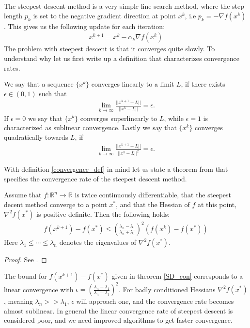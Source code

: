 \\
\\
The steepest descent method is a very simple line search method, where the step length $p_k$ is set to the negative gradient direction at point $x^k$, i.e $p_k = -\nabla f(x^k)$. This gives us the following update for each iteration:
\begin{align}
x^{k+1} = x^k - \alpha_k \nabla f(x^k) \label{SD_itr}
\end{align} 
The problem with steepest descent is that it converges quite slowly. To understand why let us first write up a definition that characterizes convergence rates.
\begin{definition} \label{convergence_def}
We say that a sequence $\{x^k\}$ converges linearly to a limit $L$, if there exists $\epsilon\in(0,1)$ such that
\begin{align*}
\lim_{k\rightarrow\infty}\frac{||x^{k+1}-L||}{||x^k-L||} =\epsilon.
\end{align*} 
If $\epsilon=0$ we say that $\{x^k\}$ converges superlinearly to $L$, while $\epsilon=1$ is characterized as sublinear convergence. Lastly we say that $\{x^k\}$ converges quadratically towards $L$, if
\begin{align*}
\lim_{k\rightarrow\infty}\frac{||x^{k+1}-L||}{||x^k-L||^2} =\epsilon.
\end{align*}
\end{definition}
\noindent
With definition \ref{convergence_def} in mind let us state a theorem from \cite{nocedal2006numerical} that specifies the convergence rate of the steepest descent method.
\begin{theorem}
\label{SD_con}
Assume that $f:\mathbb{R}^n\longrightarrow\mathbb{R}$ is twice continuously differentiable, that the steepest decent method converge to a point $x^*$, and that the Hessian of $f$ at this point, $\nabla^2 f(x^*)$ is positive definite. Then the following holds:
\begin{align*}
f(x^{k+1})-f(x^*) \leq (\frac{\lambda_n-\lambda_1}{\lambda_n+\lambda_1})^2 (f(x^{k})-f(x^*))
\end{align*}  
Here $\lambda_1\leq\cdots\leq \lambda_n$ denotes the eigenvalues of $\nabla^2 f(x^*)$.
\end{theorem}   
\begin{proof}
See \cite{nocedal2006numerical}.
\end{proof}
\noindent
The bound for $f(x^{k+1})-f(x^*)$ given in theorem \ref{SD_con} corresponds to a linear convergence with $\epsilon=(\frac{\lambda_n-\lambda_1}{\lambda_n+\lambda_1})^2$. For badly conditioned Hessians $\nabla^2 f(x^*)$, meaning $\lambda_n>>\lambda_1$, $\epsilon$ will approach one, and the convergence rate becomes almost sublinear. In general the linear convergence rate of steepest descent is considered poor, and we need improved algorithms to get faster convergence.
